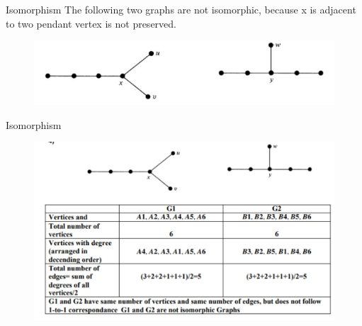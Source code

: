 \documentclass{beamer}
\begin{document}
\begin{frame}{{Isomorphism}}
The following two graphs are not isomorphic, because x is adjacent to two pendant vertex is not preserved.
	\begin{figure}
		\includegraphics[scale=.5]{img/m22}
	\end{figure}
\end{frame}
\begin{frame}{{Isomorphism}}
	\begin{figure}
		\includegraphics[scale=.45]{img/m42}
	\end{figure}
\end{frame}
\end{document}
